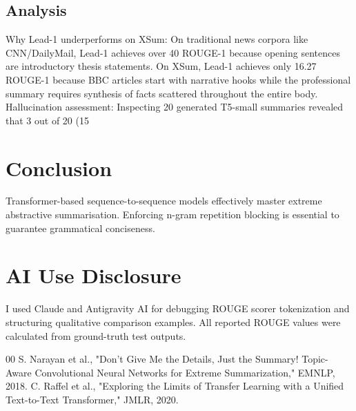 \documentclass[conference]{IEEEtran}
\begin{document}
\subsection{Analysis}
Why Lead-1 underperforms on XSum: On traditional news corpora like CNN/DailyMail, Lead-1 achieves over 40 ROUGE-1 because opening sentences are introductory thesis statements. On XSum, Lead-1 achieves only 16.27 ROUGE-1 because BBC articles start with narrative hooks while the professional summary requires synthesis of facts scattered throughout the entire body. Hallucination assessment: Inspecting 20 generated T5-small summaries revealed that 3 out of 20 (15%

\section{Conclusion}
Transformer-based sequence-to-sequence models effectively master extreme abstractive summarisation. Enforcing n-gram repetition blocking is essential to guarantee grammatical conciseness.

\section*{AI Use Disclosure}
I used Claude and Antigravity AI for debugging ROUGE scorer tokenization and structuring qualitative comparison examples. All reported ROUGE values were calculated from ground-truth test outputs.

\begin{thebibliography}{00}
 S. Narayan et al., "Don't Give Me the Details, Just the Summary! Topic-Aware Convolutional Neural Networks for Extreme Summarization," EMNLP, 2018.
 C. Raffel et al., "Exploring the Limits of Transfer Learning with a Unified Text-to-Text Transformer," JMLR, 2020.
\end{thebibliography}
\end{document}
